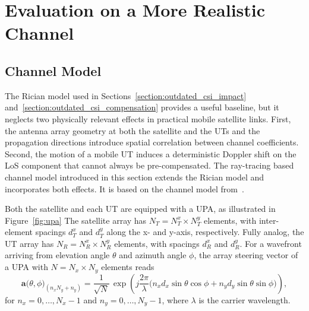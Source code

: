 \section{Evaluation on a More Realistic Channel}
\label{section:realistic_channel_evaluation}

\subsection{Channel Model}
\label{subsection:realistic_channel_model}

The Rician model used in Sections~\ref{section:outdated_csi_impact} and~\ref{section:outdated_csi_compensation} provides a useful baseline, but it neglects two physically relevant effects in practical mobile satellite links.
First, the antenna array geometry at both the satellite and the \acp{UT} and the propagation directions introduce spatial correlation between channel coefficients.
Second, the motion of a mobile \ac{UT} induces a deterministic Doppler shift on the \ac{LoS} component that cannot always be pre-compensated.
The ray-tracing based channel model introduced in this section extends the Rician model and incorporates both effects. It is based on the channel model from~\cite{8_chinese1_downlink_massive_mimo_leo, chinese0_massive_mimo_leo, 9_chinese2_downlink_robust_precoding}.

Both the satellite and each \ac{UT} are equipped with a \acf{UPA}, as illustrated in Figure~\ref{fig:upa}
The satellite array has $N_T = N_T^x \times N_T^y$ elements, with inter-element spacings $d_T^x$ and $d_T^y$ along the x- and y-axis, respectively.
Fully analog, the \ac{UT} array has $N_R = N_R^x \times N_R^y$ elements, with spacings $d_R^x$ and $d_R^y$.
For a wavefront arriving from elevation angle $\theta$ and azimuth angle $\phi$, the array steering vector of a \ac{UPA} with $N = N_x \times N_y$ elements reads
\begin{equation}
\label{eq:upa_steering_vector}
    \mathbf{a}\big(\theta, \phi\big)_{(n_x N_y + n_y)} = \frac{1}{\sqrt{N}} \, \exp\!\left( j\frac{2\pi}{\lambda} \bigl(n_x d_x \sin\theta\cos\phi + n_y d_y \sin\theta\sin\phi\bigr) \right),
\end{equation}
for $n_x = 0, \ldots, N_x - 1$ and $n_y = 0, \ldots, N_y - 1$, where $\lambda$ is the carrier wavelength.

